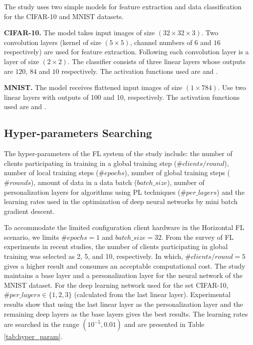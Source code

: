 \documentclass[runningheads]{llncs}
\begin{document}
The study uses two simple models for feature extraction and data classification for the CIFAR-10 and MNIST datasets.

\textbf{CIFAR-10.} The model takes input images of size $(32\times32\times3)$. Two convolution layers (kernel of size $(5\times5)$, channel numbers of $6$ and $16$ respectively) are used for feature extraction. Following each convolution layer is a  layer of size $(2\times2)$. The classifier consists of three linear layers whose outputs are $120$, $84$ and $10$ respectively. The activation functions used are  and .

\textbf{MNIST.} The model receives flattened input images of size $(1\times784)$. Use two linear layers with outputs of 100 and 10, respectively. The activation functions used are  and .

\subsection{Hyper-parameters Searching}

The hyper-parameters of the FL system of the study include: the number of clients participating in training in a global training step ($\#clients/round$), number of local training steps ($\#epochs $), number of global training steps ($\#rounds$), amount of data in a data batch ($batch\_size$), number of personalization layers for algorithms using PL techniques ($\# per\_layers$) and the learning rates used in the optimization of deep neural networks by mini batch gradient descent.

To accommodate the limited configuration client hardware in the Horizontal FL scenario, we limits $\#epochs=1$ and $batch\_size=32$. From the survey of FL experiments in recent studies, the number of clients participating in global training was selected as 2, 5, and 10, respectively. In which, $\#clients/round=5$ gives a higher result and consumes an acceptable computational cost. The study maintains a base layer and a personalization layer for the neural network of the MNIST dataset. For the deep learning network used for the set CIFAR-10, $\#per\_layers \in \{1,2,3\}$ (calculated from the last linear layer). Experimental results show that using the last linear layer as the personalization layer and the remaining deep layers as the base layers gives the best results. The learning rates are searched in the range $(10^{-5}, 0.01)$ and are presented in Table \ref{tab:hyper_param}.
\end{document}
